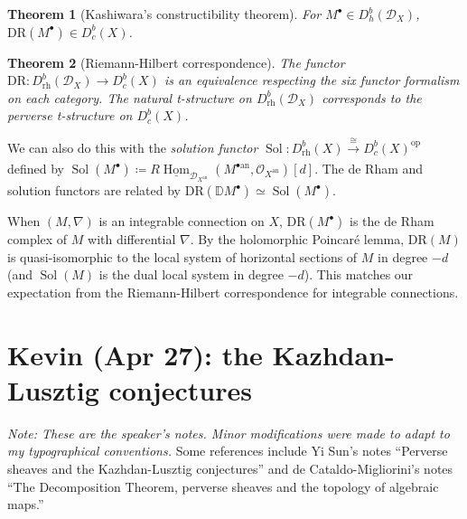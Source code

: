 \documentclass[leqno, openany]{memoir}
\newtheorem{thm}{Theorem}[section]
\theoremstyle{definition}
\theoremstyle{remark}
\theoremstyle{plain}
\theoremstyle{definition}
\theoremstyle{remark}
\newcommand{\mc}[1]{\mathcal{#1}}
\newcommand{\mr}[1]{\mathrm{#1}}
\newcommand{\ul}[1]{\underline{#1}}
\DeclareMathOperator{\Hom}{Hom}
\DeclareMathOperator{\Sol}{Sol}
\begin{document}
\begin{thm}[Kashiwara's constructibility theorem]
For $M^{\bullet} \in D_h^b(\mc{D}_X)$, $\mr{DR}(M^{\bullet}) \in D_c^b(X)$.
\end{thm}

\begin{thm}[Riemann-Hilbert correspondence]
The functor $\mr{DR}: D_{\mr{rh}}^b(\mc{D}_X) \to D_c^b(X)$ is an equivalence respecting the six functor formalism on each category. The natural t-structure on $D_{\mr{rh}}^b(\mc{D}_X)$ corresponds to the perverse t-structure on $D_c^b(X)$.
\end{thm}

We can also do this with the \textit{solution functor} $\Sol\colon D_{\mr{rh}}^b(X) \xrightarrow[]{\cong} D_c^b(X)^{\mr{op}}$ defined by $\Sol(M^{\bullet}) \coloneqq R\ul{\Hom}_{\mc{D}_{X^{\mr{an}}}}(M^{\bullet \mr{an}},\mathcal{O}_{X^{\mr{an}}})[d]$. The de Rham and solution functors are related by $\mr{DR}(\mathbb{D}M^{\bullet}) \simeq \Sol(M^{\bullet})$.

When $(M,\nabla)$ is an integrable connection on $X$, $\mr{DR}(M^{\bullet})$ is the de Rham complex of $M$ with differential $\nabla$. By the holomorphic Poincar\'{e} lemma, $\mr{DR}(M)$ is quasi-isomorphic to the local system of horizontal sections of $M$ in degree $-d$ (and $\Sol(M)$ is the dual local system in degree $-d$). This matches our expectation from the Riemann-Hilbert correspondence for integrable connections.

\chapter{Kevin (Apr 27): the Kazhdan-Lusztig conjectures}%

\textit{Note: These are the speaker's notes. Minor modifications were made to adapt to my typographical conventions.}
Some references include Yi Sun's notes ``Perverse sheaves and the Kazhdan-Lusztig conjectures'' and de Cataldo-Migliorini's notes ``The Decomposition Theorem, perverse sheaves and the topology of algebraic maps.''
\end{document}
